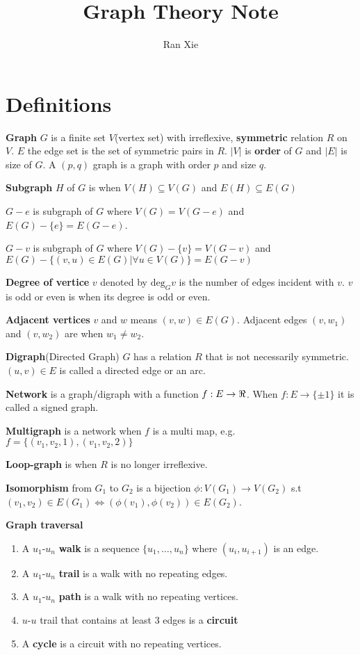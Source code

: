 \documentclass[12pt]{article}
\title{Graph Theory Note}
\author{Ran Xie}
\begin{document}
\twocolumn
\maketitle
\section{Definitions}
\textbf{Graph} $G$ is a finite set $V$(vertex set) with irreflexive, \textbf{symmetric} relation $R$ on $V$. $E$ the edge set is the set of symmetric pairs in $R$.  $|V|$ is \textbf{order} of $G$ and $|E|$ is size of $G$. A $(p, q)$ graph is a graph with order $p$ and size $q$.

\textbf{Subgraph} $H$ of $G$ is when $V(H) \subseteq V(G)$ and $E(H) \subseteq  E(G)$

\textbf{$G - e$} is subgraph of $G$ where $V(G) = V(G -e)$ and $E(G) - \{e\} = E(G-e)$.

\textbf{$G - v$} is subgraph of $G$ where $V(G) - \{v\} = V(G - v)$ and $E(G) - \{(v, u) \in E(G) | \forall u \in V(G) \} = E(G - v)$

\textbf{Degree of vertice} $v$ denoted by $\text{deg}_G v$ is the number of edges incident with $v$. $v$ is odd or even is when its degree is odd or even.

\textbf{Adjacent vertices} $v$ and $w$ means $(v,w)\in E(G)$. Adjacent edges $(v, w_1)$ and $(v, w_2)$ are when $w_1 \neq w_2$.

\textbf{Digraph}(Directed Graph) $G$ has a relation $R$ that is not necessarily symmetric. $(u,v) \in E$ is called a directed edge or an arc.

\textbf{Network} is a graph/digraph with a function $f: E \rightarrow \real$. When $f : E \rightarrow \{\pm 1\}$ it is called a signed graph. 

\textbf{Multigraph} is a network when $f$ is a multi map, e.g. $f=\{(v_1, v_2, 1), (v_1, v_2, 2)\}$

\textbf{Loop-graph} is when $R$ is no longer irreflexive.

\textbf{Isomorphism } from $G_1$ to $G_2$ is a bijection $\phi: V(G_1) \rightarrow V(G_2)$ s.t $(v_1, v_2) \in E(G_1) \iff (\phi(v_1), \phi(v_2))\in E(G_2)$.

\textbf {Graph traversal} \begin{enumerate}
	\item A $u_1$-$u_n$ \textbf{walk} is a sequence $\{u_1, \ldots, u_n\}$ where $(u_i, u_{i+1})$ is an edge.
	\item  A $u_1$-$u_n$ \textbf{trail} is a walk with no repeating edges.
	\item A $u_1$-$u_n$ \textbf{path} is a walk with no repeating vertices.
	\item $u$-$u$ trail that contains at least 3 edges is a \textbf{circuit}
	\item A \textbf{cycle} is a circuit with no repeating vertices. 
\end{enumerate} 
\end{document}
